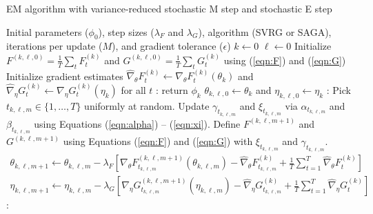\begin{algorithm}
\caption{EM algorithm with variance-reduced stochastic M step and stochastic E step}\label{alg:P-EM-SO}
\begin{algorithmic}[1]
\Require Initial parameters ($\phi_{0}$), step sizes ($\lambda_F$ and $\lambda_G$), algorithm (SVRG or SAGA), iterations per update ($M$), and gradient tolerance ($\epsilon$)
%
\vspace{10pt}
%
\State $k \gets 0$
%
\vspace{10pt}
%
\State $\ell \gets 0$
%
\vspace{10pt}
%
\State Initialize $F^{(k,\ell,0)} = \frac{1}{T} \sum_t F_t^{(k)}$ and $G^{(k,\ell,0)} = \frac{1}{T} \sum_t G_t^{(k)}$ using (\ref{eqn:F}) and (\ref{eqn:G})
%
\vspace{10pt}
%
\State Initialize gradient estimates $\widehat \nabla_\theta F_t^{(k)} \gets \nabla_\theta F_t^{(k)} (\theta_{k})$ and $\widehat \nabla_\eta G_t^{(k)} \gets \nabla_\eta G_t^{(k)} (\eta_{k})$ for all $t$
%
\vspace{10pt}
%
:
    \State return $\phi_{k}$
\EndIf
%
\vspace{10pt}
%
\State $\theta_{k,\ell,0} \gets \theta_k$ and $\eta_{k,\ell,0} \gets \eta_k$
%
\vspace{10pt}
%
:
    \State Pick $t_{k,\ell,m} \in \{1,\ldots,T\}$ uniformly at random.
    \State Update $\gamma_{t_{k,\ell,m}}$ and $\xi_{t_{k,\ell,m}}$ via $\alpha_{t_{k,\ell,m}}$ and $\beta_{t_{k,\ell,m}}$ using Equations (\ref{eqn:alpha}) -- (\ref{eqn:xi}).
    \State Define $F^{(k,\ell,m+1)}$ and $G^{(k,\ell,m+1)}$ using Equations (\ref{eqn:F}) and (\ref{eqn:G}) with $\xi_{t_{k,\ell,m}}$ and $\gamma_{t_{k,\ell,m}}$.
    \State {}
    \begin{gather}
        \theta_{k,\ell,m+1} \gets \theta_{k,\ell,m} - \lambda_F \left[\nabla_\theta F_{t_{k,\ell,m}}^{(k,\ell,m+1)}(\theta_{k,\ell,m}) - \widehat \nabla_\theta F_{t_{k,\ell,m}}^{(k)} + \frac{1}{T} \sum_{t=1}^T \widehat \nabla_\theta F^{(k)}_{t} \right] \\
        \eta_{k,\ell,m+1} \gets \eta_{k,\ell,m} - \lambda_G \left[\nabla_\eta G_{t_{k,\ell,m}}^{(k,\ell,m+1)}(\eta_{k,\ell,m}) - \widehat \nabla_\eta G_{t_{k,\ell,m}}^{(k)} + \frac{1}{T} \sum_{t=1}^T \widehat \nabla_\eta G^{(k)}_{t} \right]
    \end{gather}
    :

\end{algorithmic}
\end{algorithm}
